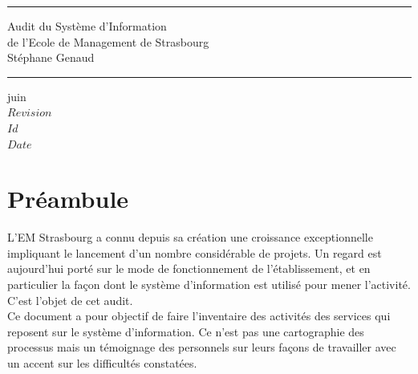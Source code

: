 \documentclass{book}
\begin{document}
\newcommand{\motcle}[1]{\index{#1}{#1}}
\newcommand{\clecommun}{stockage partagé en réseau\xspace}
\newcommand{\sre}{service relations entreprises\xspace}
\newcommand{\srh}{service ressources humaines\xspace}
\newcommand{\sop}{service organisation et process\xspace}
\newcommand{\scom}{service communication\xspace}
\newcommand{\sconc}{service concours\xspace}
\newcommand{\sintl}{service international\xspace}
\newcommand{\CK}{Christos Karacostas\xspace}
\newcommand{\NB}{Nicolas Beyhurst\xspace}


\thispagestyle{empty}
\rhead[]{}
\pagestyle{fancy}
\setlength{\parindent}{0mm}
\setlength{\parskip}{0mm}
\rule{\linewidth}{1mm}
\begin{center}
\Large{Audit du Système d'Information}\\[5mm]
\Large{de l'Ecole de Management de Strasbourg}\\[5mm]
\large{Stéphane Genaud}
\rule{\linewidth}{1mm}
\end{center}
\begin{center}
juin  \\
\textrm{
$Revision$\\
$Id$\\
$Date$\\
}
\end{center}

\tableofcontents
\newpage


\chapter*{Préambule}

L'EM Strasbourg a connu depuis sa création une croissance exceptionnelle impliquant
le lancement d'un nombre considérable de projets. Un regard est aujourd'hui porté
sur le mode de fonctionnement de l'établissement, et en particulier la façon dont
le système d'information est utilisé pour mener l'activité. C'est l'objet de cet
audit.\\

Ce document a pour objectif de faire l'inventaire des activités des services qui
reposent sur le système d'information. Ce n'est pas une cartographie des processus
mais un témoignage des personnels sur leurs façons de travailler avec un accent
sur les difficultés constatées.\\
\end{document}
